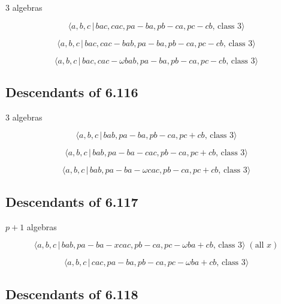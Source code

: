 \documentclass[10pt]{article}
\begin{document}
3 algebras

\begin{equation}
\langle a,b,c\,|\,bac,cac,pa-ba,pb-ca,pc-cb,\,\text{class }3\rangle 
\tag{7.1390}
\end{equation}

\begin{equation}
\langle a,b,c\,|\,bac,cac-bab,pa-ba,pb-ca,pc-cb,\,\text{class }3\rangle 
\tag{7.1391}
\end{equation}

\begin{equation}
\langle a,b,c\,|\,bac,cac-\omega bab,pa-ba,pb-ca,pc-cb,\,\text{class }%
3\rangle  \tag{7.1392}
\end{equation}

\subsection{Descendants of 6.116}

3 algebras

\begin{equation}
\langle a,b,c\,|\,bab,pa-ba,pb-ca,pc+cb,\,\text{class }3\rangle  \tag{7.1393}
\end{equation}

\begin{equation}
\langle a,b,c\,|\,bab,pa-ba-cac,pb-ca,pc+cb,\,\text{class }3\rangle 
\tag{7.1394}
\end{equation}

\begin{equation}
\langle a,b,c\,|\,bab,pa-ba-\omega cac,pb-ca,pc+cb,\,\text{class }3\rangle 
\tag{7.1395}
\end{equation}

\subsection{Descendants of 6.117}

$p+1$ algebras

\begin{equation}
\langle a,b,c\,|\,bab,pa-ba-xcac,pb-ca,pc-\omega ba+cb,\,\text{class }%
3\rangle \;(\text{all }x)  \tag{7.1396}
\end{equation}

\begin{equation}
\langle a,b,c\,|\,cac,pa-ba,pb-ca,pc-\omega ba+cb,\,\text{class }3\rangle 
\tag{7.1397}
\end{equation}

\subsection{Descendants of 6.118}
\end{document}
